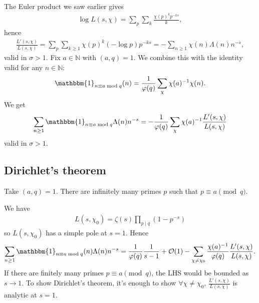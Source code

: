 \documentclass{article}
\newcommand{\1}{\mathbbm{1}}
\newcommand{\bigO}{\mathcal{O}}
\begin{document}
\newlec
The Euler product we saw earlier gives
\begin{align*}
  \log L(s,\chi) = \sum_p \sum_k \frac{\chi(p)^k p^{-ks}}{k},
\end{align*}
hence
\begin{align*}
  \frac{L'(s,\chi)}{L(s,\chi)} = \sum_p \sum_{k \geq 1} \chi(p)^k (-\log p) p^{-ks} = -\sum_{n \geq 1} \chi(n) \Lambda(n) n^{-s},
\end{align*}
valid in $\sigma > 1$.
Fix $a \in \mathbb{N}$ with $(a,q) = 1$. We combine this with the identity valid for any $n \in \mathbb{N}$:
\begin{align*}
  \1_{n \equiv a \bmod{q}}(n) = \frac{1}{\varphi(q)}\sum_\chi \chi(a)^{-1} \chi(n).
\end{align*}
We get
\begin{align*}
  \sum_{n \geq 1} \1_{n \equiv a \bmod{q}} \Lambda(n) n^{-s} = -\frac{1}{\varphi(q)} \sum_\chi \chi(a)^{-1} \frac{L'(s,\chi)}{L(s,\chi)}
\end{align*}
valid in $\sigma>1$.

\subsection{Dirichlet's theorem}
\begin{thm}[Dirichlet]
  Take $(a,q)=1$. There are infinitely many primes $p$ such that $p \equiv a \pmod{q}$.
\end{thm}
We have
\begin{align*}
  L(s,\chi_0) = \zeta(s) \prod_{p \mid q}(1 - p^{-s})
\end{align*}
so $L(s,\chi_0)$ has a simple pole at $s=1$.
Hence
\begin{align*}
  \sum_{n \geq 1} \1_{n \equiv a \bmod{q}}(n) \Lambda(n) n^{-s} = \frac{1}{\varphi(q)} \frac{1}{s-1} + \bigO(1) - \sum_{\chi \neq \chi_0} \frac{\chi(a)^{-1}}{\varphi(q)} \frac{L'(s,\chi)}{L(s,\chi)}.
\end{align*}
If there are finitely many primes $p \equiv a \pmod{q}$, the LHS would be bounded as $s \to 1$.
To show Dirichlet's theorem, it's enough to show $\forall \chi \neq \chi_0$, $\frac{L'(s,\chi)}{L(s,\chi)}$ is analytic at $s=1$.
\end{document}
